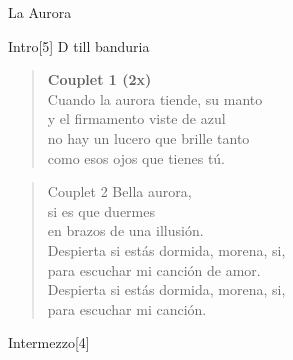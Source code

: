 \begin{song}[vals]{La Aurora}
\begin{instrumental}{Intro}[5]
D till banduria\\
 \measure{}   \measure{}
\measure{} \measure{} \measure*{} 
 \measure{} \measure{}  \measure{}
 \measure{}  \measure{}  
\end{instrumental}
\begin{verse}{}
\hspace{-2em}\textbf{Couplet 1 (2x)}\\
Cuando la aurora tiende, su manto\\
y el firmamento viste de azul\hspace{3em}
\\ no hay un lucero que brille tanto\\
como esos ojos que tienes tú.\hspace{3em}\\
\end{verse}
\begin{verse}{Couplet 2}
Bella aurora,\\
si es que duermes\\
en brazos de una illusión.\hspace{1em}\\
Despierta si estás dormida, morena, si,\\
para escuchar mi canción de amor.\\
Despierta si estás dormida, morena, si,\\
para escuchar mi canción.\hspace{1em}\hspace{2em}\\
\end{verse}
\vspace{4ex}
\vspace{-1ex}
\begin{instrumental}{Intermezzo}[4]

\end{instrumental}
\end{song}
